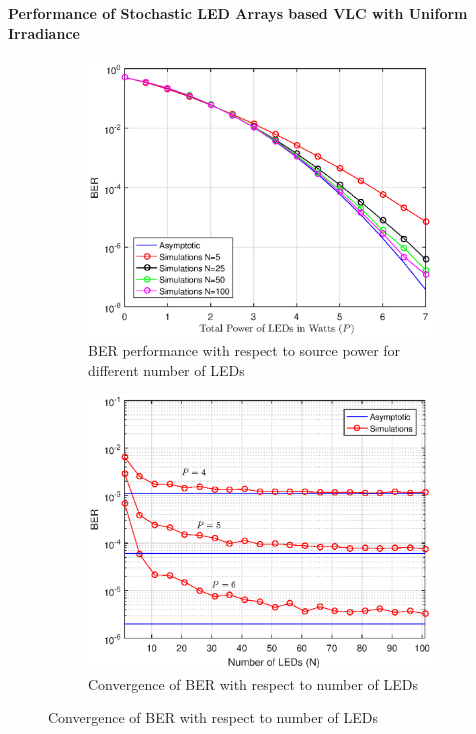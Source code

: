 \documentclass[slidestop,usepdftitle=false]{gvvslides}
\begin{document}
\begin{frame}
\frametitle{\,}
\framesubtitle{Performance of Stochastic LED Arrays based VLC with Uniform Irradiance}
\begin{figure}
 \begin{subfigure}[t]{0.49\framewidth}
      \centering
      \includegraphics[width=\columnwidth]{berCurveVariousN}
      \caption{ BER performance with respect to source power for different number of LEDs}
            \label{fig:PeVSSnr}
 \end{subfigure} 
 \begin{subfigure}[t]{0.49\framewidth}
      \centering
      \includegraphics[width=\columnwidth]{berCurveVSN}
      \caption{Convergence of BER with respect to number of LEDs}
         \label{fig:PeConvergence}
 \end{subfigure} 
\end{figure}
\end{frame}
\end{document}
